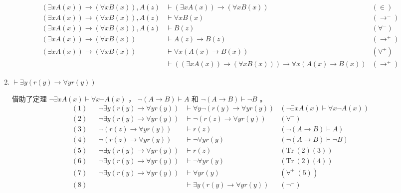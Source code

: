 \documentclass[UTF8]{ctexart}
\begin{document}
\begin{enumerate}
\begin{align*}
            (\exists x A(x)) \to (\forall x B(x)), A(z) & \vdash (\exists x A(x)) \to (\forall x B(x)) & (\in) \\
            (\exists x A(x)) \to (\forall x B(x)), A(z) & \vdash \forall x B(x) & (\to^{-}) \\
            (\exists x A(x)) \to (\forall x B(x)), A(z) & \vdash B(z) & (\forall^{-}) \\
            (\exists x A(x)) \to (\forall x B(x)) & \vdash A(z) \to B(z) & (\to^{+}) \\
            (\exists x A(x)) \to (\forall x B(x)) & \vdash \forall x (A(x) \to B(x)) & (\forall^{+}) \\
            & \vdash ((\exists x A(x)) \to (\forall x B(x))) \to \forall x (A(x) \to B(x)) & (\to^{+})
        \end{align*}
        \item $\vdash \exists y(r(y) \to \forall y r(y))$ \par
        借助了定理 $\lnot \exists x A(x) \vdash \forall x \lnot A(x)$ ， $\lnot (A \to B) \vdash A$ 和 $\lnot (A \to B) \vdash \lnot B$ 。
        \begin{align*}
            (1) && \lnot \exists y (r(y) \to \forall y r(y)) & \vdash \forall y \lnot (r(y) \to \forall y r(y)) & (\lnot \exists x A(x) \vdash \forall x \lnot A(x)) \\
            (2) && \lnot \exists y (r(y) \to \forall y r(y)) & \vdash \lnot (r(z) \to \forall y r(y)) & (\forall^{-}) \\
            (3) && \lnot (r(z) \to \forall y r(y)) & \vdash r(z) & (\lnot (A \to B) \vdash A) \\
            (4) && \lnot (r(z) \to \forall y r(y)) & \vdash \lnot \forall y r(y) & (\lnot (A \to B) \vdash \lnot B) \\
            (5) && \lnot \exists y (r(y) \to \forall y r(y)) & \vdash r(z) & (\mathrm{Tr}\ (2)(3)) \\
            (6) && \lnot \exists y (r(y) \to \forall y r(y)) & \vdash \lnot \forall y r(y) & (\mathrm{Tr}\ (2)(4)) \\
            (7) && \lnot \exists y (r(y) \to \forall y r(y)) & \vdash \forall y r(y) & (\forall^{+}\ (5)) \\
            (8) && & \vdash \exists y (r(y) \to \forall y r(y)) & (\lnot^{-})
        \end{align*}
    \end{enumerate}

    \newpage
\end{document}
